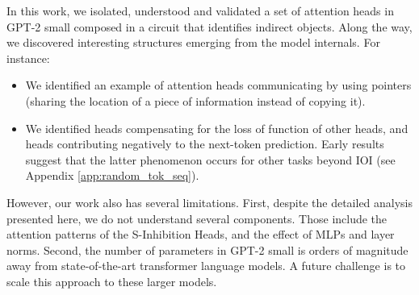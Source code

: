 
In this work, we isolated, understood and validated a set of attention heads in GPT-2 small composed in a circuit that identifies indirect objects. %
Along the way, we discovered interesting structures emerging from the model internals. For instance:
\begin{itemize}
    \item We identified an example of attention heads communicating by using pointers  (sharing the location of a piece of information instead of copying it).
    \item We identified heads compensating for the loss of function of other heads, and heads contributing negatively to the next-token prediction. Early results suggest that the latter phenomenon occurs for other tasks beyond IOI (see Appendix \ref{app:random_tok_seq}).
\end{itemize}


However, our work also has several limitations. First, despite the detailed analysis presented here, we do not understand several components. Those include the attention patterns of the S-Inhibition Heads, and the effect of MLPs and layer norms. %
%
%
Second, the number of parameters in GPT-2 small is orders of magnitude away from state-of-the-art transformer language models. A future challenge is to scale this approach to these larger models.

